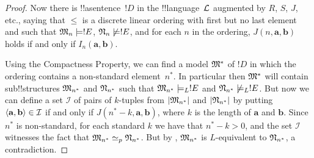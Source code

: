 \documentclass[../../../include/open-logic-section]{subfiles}
\begin{document}
\begin{proof}
Now there is !!a{sentence}~$!D$ in the !!{language}~$\Lang{L}$ augmented
by $R$, $S$, $J$, etc., saying that $\le$ is a discrete linear ordering
with first but no last element and such that $\Struct{M}_n \models
!E$, $\Struct{N}_n \not\models !E$, and for each $n$ in the
ordering, $J(n, \mathbf{a}, \mathbf{b})$ holds if and only if
$I_n(\mathbf{a}, \mathbf{b})$.

Using the Compactness Property, we can find a model $\Struct{M}^*$ of
$!D$ in which the ordering contains a non-standard element~$n^*$. In
particular then $\Struct{M^*}$ will contain sub!!{structure}s
$\Struct{M_{n^*}}$ and $\Struct{N_{n^*}}$ such that $\Struct{M_{n^*}}
\models_L !E$ and $\Struct{N_{n^*}} \not\models_L !E$. But now we can
define a set $\mathcal{I}$ of pairs of $k$-tuples from
$\Domain{M_{n^*}}$ and $\Domain{N_{n^*}}$ by putting
$\langle \mathbf{a}, \mathbf{b} \rangle \in \mathcal{I}$ if and only if
$J(n^*-k, \mathbf{a}, \mathbf{b})$, where $k$ is the length of
$\mathbf{a}$ and $\mathbf{b}$. Since $n^*$ is non-standard, for each
standard $k$ we have that $n^* - k >0$, and the set $\mathcal{I}$
witnesses the fact that $\Struct{M_{n^*}} \simeq_p
\Struct{N_{n^*}}$. But by ,
$\Struct{M_{n^*}}$ is $L$-equivalent to $\Struct{N_{n^*}}$, a
contradiction.
\end{proof}
\end{document}
